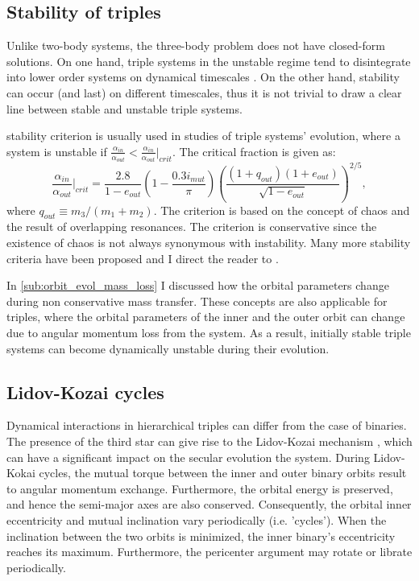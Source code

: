 \subsection{Stability of triples}\label{sub:stability_triples}

Unlike two-body systems, the three-body problem does not have closed-form solutions. On one hand, triple systems in the unstable regime tend to disintegrate into lower order systems on dynamical timescales \citep{van2007formation}. On the other hand, stability can occur (and last) on different timescales, thus it is not trivial to draw a clear line between stable and unstable triple systems. 

\cite{mardling1999dynamics} stability criterion is usually used in studies of triple systems' evolution, where a system is unstable if
$\frac{\alpha_{in}}{\alpha_{out}} < \frac{\alpha_{in}}{\alpha_{out}} |_{crit}$. The critical fraction is given as:
\begin{equation}\label{eq:stability_regime}
    \frac{\alpha_{in}}{\alpha_{out}} |_{crit} = \frac{2.8}{1-e_{out}} (1- \frac{0.3 i_{mut}}{\pi}) \left ( \frac{(1 + q_{out})(1+e_{out})}{\sqrt{1-e_{out}}} \right )^{2/5},
\end{equation}
where $q_{out} \equiv m_3 / (m_1 + m_2)$. The criterion is based on the concept of chaos and the result of overlapping resonances. The criterion is conservative since the existence of chaos is not always synonymous with instability. Many more stability criteria have been proposed and I direct the reader to \cite{mardling2001stability,georgakarakos2008stability}.

In \cref{sub:orbit_evol_mass_loss} I discussed how the orbital parameters change during non conservative mass transfer. These concepts are also applicable for triples, where the orbital parameters of the inner and the outer orbit can change due to angular momentum loss from the system. As a result, initially stable triple systems can become dynamically unstable during their evolution.

\subsection{Lidov-Kozai cycles}\label{sub:lidov_kozai}

Dynamical interactions in hierarchical triples can differ from the case of binaries. The presence of the third star can give rise to the Lidov-Kozai mechanism \citep{lidov1962evolution,kozai1962secular}, which can have a significant impact on the secular evolution the system. During Lidov-Kokai cycles, the mutual torque between the inner and outer binary orbits result to angular momentum exchange. Furthermore, the orbital energy is preserved, and hence the semi-major axes are also conserved. Consequently, the orbital inner eccentricity and mutual inclination vary periodically (i.e. 'cycles'). When the inclination between the two orbits is minimized, the inner binary's eccentricity reaches its maximum. Furthermore, the pericenter argument may rotate or librate periodically.

